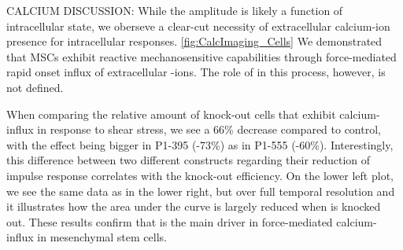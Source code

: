 CALCIUM DISCUSSION:
While the amplitude is likely a function of intracellular state, we oberseve a clear-cut necessity of extracellular calcium-ion presence for intracellular responses. \ref{fig:CalcImaging_Cells}
We demonstrated that MSCs exhibit reactive mechanosensitive capabilities through force-mediated rapid onset influx of extracellular \calcium{}-ions. The role of \Piezo{} in this process, however, is not defined. 

When comparing the relative amount of knock-out cells that exhibit calcium-influx in response to shear stress, we see a 66\% decrease compared to control, with the effect being bigger in P1-395 (-73\%) as in P1-555 (-60\%). Interestingly, this difference between two different constructs regarding their reduction of impulse response correlates with the knock-out efficiency. On the lower left plot, we see the same data as in the lower right, but over full temporal resolution and it illustrates how the area under the curve is largely reduced when \Piezo{} is knocked out. 
These results confirm that \Piezo{} is the main driver in force-mediated calcium-influx in mesenchymal stem cells.
